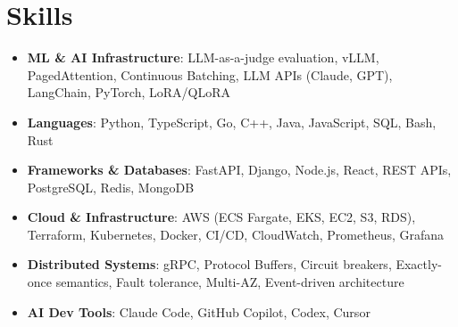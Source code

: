 \documentclass[letterpaper,11pt]{article}
\newcommand{\resumeSubHeadingListStart}{\begin{itemize}[leftmargin=0.15in, label={}]}
\newcommand{\resumeSubHeadingListEnd}{\end{itemize}}
\newcommand{\resumeSkillHeading}[2]{%
  \item\small{\textbf{#1}: #2 \vspace{-9pt}}%
}
\begin{document}
\section{Skills}
  \resumeSubHeadingListStart
    \resumeSkillHeading{ML \& AI Infrastructure}{LLM-as-a-judge evaluation, vLLM, PagedAttention, Continuous Batching, LLM APIs (Claude, GPT), LangChain, PyTorch, LoRA/QLoRA}
    \resumeSkillHeading{Languages}{Python, TypeScript, Go, C++, Java, JavaScript, SQL, Bash, Rust}
    \resumeSkillHeading{Frameworks \& Databases}{FastAPI, Django, Node.js, React, REST APIs, PostgreSQL, Redis, MongoDB}
    \resumeSkillHeading{Cloud \& Infrastructure}{AWS (ECS Fargate, EKS, EC2, S3, RDS), Terraform, Kubernetes, Docker, CI/CD, CloudWatch, Prometheus, Grafana}
    \resumeSkillHeading{Distributed Systems}{gRPC, Protocol Buffers, Circuit breakers, Exactly-once semantics, Fault tolerance, Multi-AZ, Event-driven architecture}
    \resumeSkillHeading{AI Dev Tools}{Claude Code, GitHub Copilot, Codex, Cursor}
  \resumeSubHeadingListEnd
\end{document}
